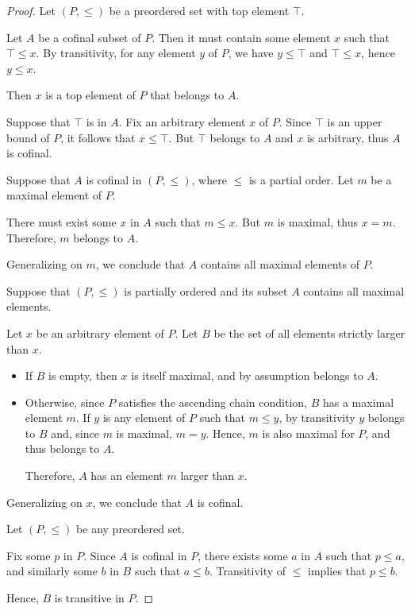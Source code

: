 \begin{proof}
   Let \( (P, \leq) \) be a preordered set with top element \( \top \).

  \SufficiencySubProof* Let \( A \) be a cofinal subset of \( P \). Then it must contain some element \( x \) such that \( \top \leq x \). By transitivity, for any element \( y \) of \( P \), we have \( y \leq \top \) and \( \top \leq x \), hence \( y \leq x \).

  Then \( x \) is a top element of \( P \) that belongs to \( A \).

  \NecessitySubProof* Suppose that \( \top \) is in \( A \). Fix an arbitrary element \( x \) of \( P \). Since \( \top \) is an upper bound of \( P \), it follows that \( x \leq \top \). But \( \top \) belongs to \( A \) and \( x \) is arbitrary, thus \( A \) is cofinal.

   Suppose that \( A \) is cofinal in \( (P, \leq) \), where \( \leq \) is a partial order. Let \( m \) be a maximal element of \( P \).

  There must exist some \( x \) in \( A \) such that \( m \leq x \). But \( m \) is maximal, thus \( x = m \). Therefore, \( m \) belongs to \( A \).

  Generalizing on \( m \), we conclude that \( A \) contains all maximal elements of \( P \).

   Suppose that \( (P, \leq) \) is partially ordered and its subset \( A \) contains all maximal elements.

  Let \( x \) be an arbitrary element of \( P \). Let \( B \) be the set of all elements strictly larger than \( x \).
  \begin{itemize}
    \item If \( B \) is empty, then \( x \) is itself maximal, and by assumption belongs to \( A \).
    \item Otherwise, since \( P \) satisfies the ascending chain condition, \( B \) has a maximal element \( m \). If \( y \) is any element of \( P \) such that \( m \leq y \), by transitivity \( y \) belongs to \( B \) and, since \( m \) is maximal, \( m = y \). Hence, \( m \) is also maximal for \( P \), and thus belongs to \( A \).

    Therefore, \( A \) has an element \( m \) larger than \( x \).
  \end{itemize}

  Generalizing on \( x \), we conclude that \( A \) is cofinal.

   Let \( (P, \leq) \) be any preordered set.

  Fix some \( p \) in \( P \). Since \( A \) is cofinal in \( P \), there exists some \( a \) in \( A \) such that \( p \leq a \), and similarly some \( b \) in \( B \) such that \( a \leq b \). Transitivity of \( \leq \) implies that \( p \leq b \).

  Hence, \( B \) is transitive in \( P \).
\end{proof}

